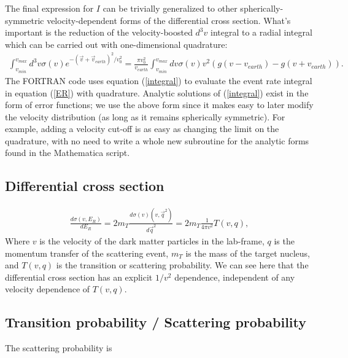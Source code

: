 \documentclass[11pt]{amsart}
\begin{document}
The final expression for $I$ can be trivially generalized to other spherically-symmetric velocity-dependent forms of the differential cross section. What's important is the reduction of the velocity-boosted $d^3v$ integral to a radial integral which can be carried out with one-dimensional quadrature:
\begin{equation}\label{integral}
\begin{split}
\int_{v_{min}}^{v_{max}} d^3v \sigma(v) e^{-(\vec{v}+\vec{v}_{earth})^2/v_0^2} 
	= \frac{\pi v_0^2}{v_{earth} }\int_{v_{min}}^{v_{max}} dv \sigma(v) v^2\left( g(v-v_{earth}) - g(v+v_{earth}) \right).
\end{split}
\end{equation}
The FORTRAN code uses equation (\ref{integral}) to evaluate the event rate integral in equation (\ref{ER}) with quadrature. Analytic solutions of  (\ref{integral}) exist in the form of error functions; we use the above form since it makes easy to later modify the velocity distribution (as long as it remains spherically symmetric). For example, adding a velocity cut-off is as easy as changing the limit on the quadrature, with no need to write a whole new subroutine for the analytic forms found in the Mathematica script.

\subsection{Differential cross section}\label{crosssection}
\begin{equation}
\begin{split}
\frac{d\sigma(v,E_R)}{dE_R} = 2m_T \frac{d\sigma(v)(v,\vec{q}^2)}{d\vec{q}^2} = 2m_T\frac{1}{4\pi v^2}T(v,q),
\end{split}
\end{equation}
Where $v$ is the velocity of the dark matter particles in the lab-frame, $q$ is the momentum transfer of the scattering event, $m_T$ is the mass of the target nucleus, and $T(v,q)$ is the transition or scattering probability. We can see here that the differential cross section has an explicit $1/v^2$ dependence, independent of any velocity dependence of $T(v,q)$.


\subsection{Transition probability / Scattering probability}

The scattering probability is
\end{document}
